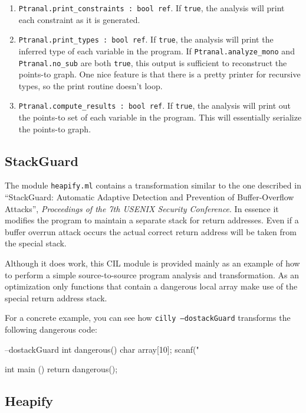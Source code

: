 \documentclass{article}
\def\t#1{{\tt #1}}
\begin{document}
\begin{enumerate}
\item \t{Ptranal.print\_constraints : bool ref}. If \t{true}, the
analysis will print each constraint as it is generated.
\item \t{Ptranal.print\_types : bool ref}. If \t{true}, the analysis
will print the inferred type of each variable in the program. If
\t{Ptranal.analyze\_mono} and \t{Ptranal.no\_sub} are both \t{true},
this output is sufficient to reconstruct the points-to graph. One nice
feature is that there is a pretty printer for recursive types, so the
print routine doesn't loop.
\item \t{Ptranal.compute\_results : bool ref}. If \t{true}, the
analysis will print out the points-to set of each variable in the
program. This will essentially serialize the points-to graph.
\end{enumerate}

\subsection{StackGuard}

The module \t{heapify.ml} contains a transformation similar to the one
described in ``StackGuard: Automatic Adaptive Detection and Prevention of
Buffer-Overflow Attacks'', {\em Proceedings of the 7th USENIX Security
Conference}. In essence it modifies the program to maintain a separate
stack for return addresses. Even if a buffer overrun attack occurs the
actual correct return address will be taken from the special stack. 

Although it does work, this CIL module is provided mainly as an example of
how to perform a simple source-to-source program analysis and
transformation. As an optimization only functions that contain a dangerous
local array make use of the special return address stack. 

For a concrete example, you can see how \t{cilly --dostackGuard}
transforms the following dangerous code: 

\begin{cilcode}[global] --dostackGuard
  int dangerous() {
    char array[10];
    scanf("%
  }

  int main () {
    return dangerous();
  }
\end{cilcode}


\subsection{Heapify}
 
\end{document}
